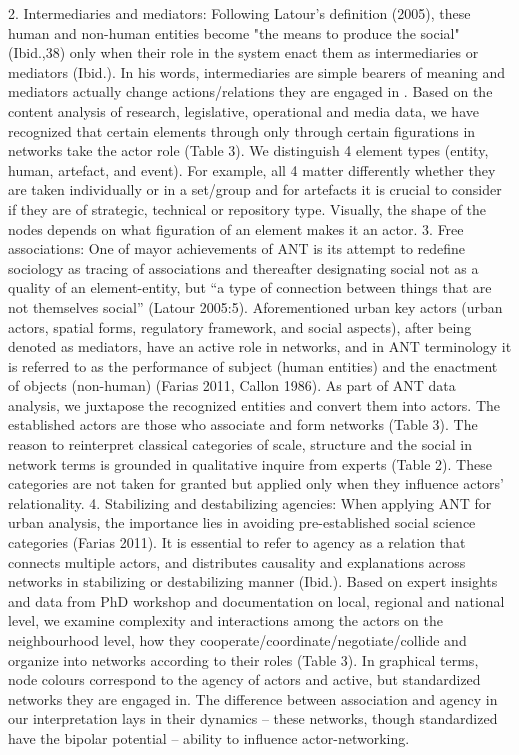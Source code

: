\documentclass[11pt]{report}
\begin{document}
2.	Intermediaries and mediators: Following Latour’s definition (2005), these human and non-human entities become "the means to produce the social" (Ibid.,38) only when their role in the system enact them as intermediaries or mediators (Ibid.). In his words, intermediaries are simple bearers of meaning  and mediators actually change actions/relations they are engaged in .
Based on the content analysis of research, legislative, operational and media data, we have recognized that certain elements through only through certain figurations in networks take the actor role (Table 3). We distinguish 4 element types (entity, human, artefact, and event). For example, all 4 matter differently whether they are taken individually or in a set/group and for artefacts it is crucial to consider if they are of strategic, technical or repository type. Visually, the shape of the nodes depends on what figuration of an element makes it an actor.
3.	Free associations: One of mayor achievements of ANT is its attempt to redefine sociology as tracing of associations and thereafter designating social not as a quality of an element-entity, but “a type of connection between things that are not themselves social” (Latour 2005:5).
Aforementioned urban key actors (urban actors, spatial forms, regulatory framework, and social aspects), after being denoted as mediators, have an active role in networks, and in ANT terminology it is referred to as the performance of subject (human entities) and the enactment of objects (non-human) (Farias 2011, Callon 1986). As part of ANT data analysis, we juxtapose the recognized entities and convert them into actors. The established actors are those who associate and form networks (Table 3). The reason to reinterpret classical categories of scale, structure and the social in network terms is grounded in qualitative inquire from experts (Table 2). These categories are not taken for granted but applied only when they influence actors’ relationality.
4.	Stabilizing and destabilizing agencies: When applying ANT for urban analysis, the importance lies in avoiding pre-established social science categories (Farias 2011). It is essential to refer to agency as a relation that connects multiple actors, and distributes causality and explanations across networks in stabilizing or destabilizing manner (Ibid.). 
Based on expert insights and data from PhD workshop and documentation on local, regional and national level, we examine complexity and interactions among the actors on the neighbourhood level, how they cooperate/coordinate/negotiate/collide and organize into networks according to their roles (Table 3). In graphical terms, node colours correspond to the agency of actors and active, but standardized networks they are engaged in. The difference between association and agency in our interpretation lays in their dynamics – these networks, though standardized have the bipolar potential – ability to influence actor-networking.
\end{document}
